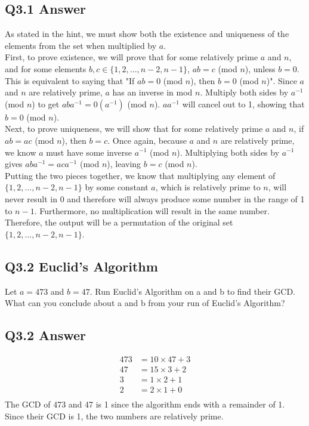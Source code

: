 \documentclass{article}
\begin{document}
\subsection*{Q3.1 Answer}
As stated in the hint, we must show both the existence and uniqueness of the elements from the set when multiplied by $a$.
\\ First, to prove existence, we will prove that for some relatively prime $a$ and $n$, and for some elements $b,c\in \{1,2,...,n-2,n-1\}$,  $ab=c$ (mod $n$), unless $b=0$. This is equivalent to saying that "If $ab=0$ (mod $n$), then $b=0$ (mod $n$)". Since $a$ and $n$ are relatively prime, $a$ has an inverse in mod $n$. Multiply both sides by $a^{-1}$ (mod $n$) to get $aba^{-1}=0(a^{-1})$ (mod $n$). $aa^{-1}$ will cancel out to 1, showing that $b=0$ (mod $n$).
\\ Next, to prove uniqueness, we will show that for some relatively prime $a$ and $n$, if $ab=ac$ (mod $n$), then $b=c$. Once again, because $a$ and $n$ are relatively prime, we know $a$ must have some inverse $a^{-1}$ (mod $n$). Multiplying both sides by $a^{-1}$ gives $aba^{-1}=aca^{-1}$ (mod $n$), leaving $b=c$ (mod $n$).
\\ Putting the two pieces together, we know that multiplying any element of $\{1,2,...,n-2,n-1\}$ by some constant $a$, which is relatively prime to $n$, will never result in 0 and therefore will always produce some number in the range of 1 to $n-1$. Furthermore, no multiplication will result in the same number. Therefore, the output will be a permutation of the original set $\{1,2,...,n-2,n-1\}$.
\newpage
\subsection*{Q3.2 Euclid's Algorithm}
Let $a = 473$ and $b = 47$. Run Euclid's Algorithm on a and b to find their GCD. What can you conclude about a and b from your run of Euclid's Algorithm?
\newpage
{}
\subsection*{Q3.2 Answer}
\begin{align*}
473 &= 10 \times 47 + 3 \\
47 &= 15 \times 3 + 2 \\
3 &= 1 \times 2 + 1 \\
2 &= 2 \times 1 + 0 \\
\end{align*}
The GCD of 473 and 47 is 1 since the algorithm ends with a remainder of 1. Since their GCD is 1, the two numbers are relatively prime.
\newpage
{}
\end{document}
